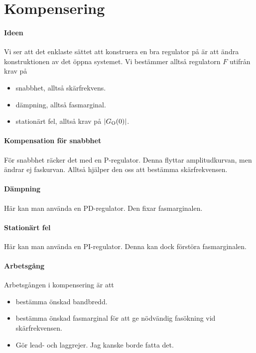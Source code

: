 \section{Kompensering}

\paragraph{Ideen}
Vi ser att det enklaste sättet att konstruera en bra regulator på är att ändra konstruktionen av det öppna systemet. Vi bestämmer alltså regulatorn $F$ utifrån krav på
\begin{itemize}
	\item snabbhet, alltså skärfrekvens.
	\item dämpning, alltså fasmarginal.
	\item stationärt fel, alltså krav på $\abs{G_{\text{O}}(0)}$.
\end{itemize}

\paragraph{Kompensation för snabbhet}
För snabbhet räcker det med en P-regulator. Denna flyttar amplitudkurvan, men ändrar ej faskurvan. Alltså hjälper den oss att bestämma skärfrekvensen.

\paragraph{Dämpning}
Här kan man använda en PD-regulator. Den fixar fasmarginalen.

\paragraph{Stationärt fel}
Här kan man använda en PI-regulator. Denna kan dock förstöra fasmarginalen.

\paragraph{Arbetsgång}
Arbetsgången i kompensering är att
\begin{itemize}
	\item bestämma önskad bandbredd.
	\item bestämma önskad fasmarginal för att ge nödvändig fasökning vid skärfrekvensen.
	\item Gör lead- och laggrejer. Jag kanske borde fatta det.
\end{itemize}